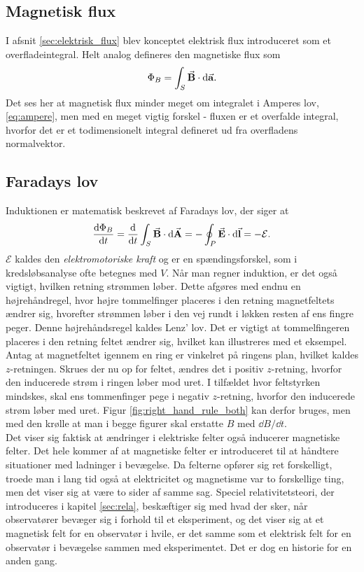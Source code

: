 \subsection{Magnetisk flux}
I afsnit \ref{sec:elektrisk_flux} blev konceptet elektrisk flux introduceret som et overfladeintegral. Helt analog defineres den magnetiske flux som
%
\begin{align} \label{eq:magnetisk_flux}
    \Phi_B = \int_S \va B \cdot \dd \va a.
\end{align}
%
Det ses her at magnetisk flux minder meget om integralet i Amperes lov, \eqref{eq:ampere}, men med en meget vigtig forskel - fluxen er et overfalde integral, hvorfor det er et todimensionelt integral defineret ud fra overfladens normalvektor.

\subsection{Faradays lov}
Induktionen er matematisk beskrevet af Faradays lov, der siger at
%
\begin{align} \label{eq:faraday}
    \dv{\Phi_B}{t} = \dv{}{t} \int_S \va B \cdot \dd \va A = - \oint_P \va E\cdot \dd \va l = -\mathcal{E}.
\end{align}
%
$\mathcal{E}$ kaldes den \emph{elektromotoriske kraft} og er en spændingsforskel, som i kredsløbsanalyse ofte betegnes med $V$. %
%
%
Når man regner induktion, er det også vigtigt, hvilken retning strømmen løber. Dette afgøres med endnu en højrehåndregel, hvor højre tommelfinger placeres i den retning magnetfeltets ændrer sig, hvorefter strømmen løber i den vej rundt i løkken resten af ens fingre peger. Denne højrehåndsregel kaldes Lenz' lov. Det er vigtigt at tommelfingeren placeres i den retning feltet ændrer sig, hvilket kan illustreres med et eksempel. Antag at magnetfeltet igennem en ring er vinkelret på ringens plan, hvilket kaldes $z$-retningen. Skrues der nu op for feltet, ændres det i positiv $z$-retning, hvorfor den inducerede strøm i ringen løber mod uret. I tilfældet hvor feltstyrken mindskes, skal ens tommenfinger pege i negativ $z$-retning, hvorfor den inducerede strøm løber med uret. Figur \ref{fig:right_hand_rule_both} kan derfor bruges, men med den krølle at man i begge figurer skal erstatte $B$ med $\dd{B}/\dd{t}$. \\
%
Det viser sig faktisk at ændringer i elektriske felter også inducerer magnetiske felter. Det hele kommer af at magnetiske felter er introduceret til at håndtere situationer med ladninger i bevægelse. Da felterne opfører sig ret forskelligt, troede man i lang tid også at elektricitet og magnetisme var to forskellige ting, men det viser sig at være to sider af samme sag. Speciel relativitetsteori, der introduceres i kapitel \ref{sec:rela}, beskæftiger sig med hvad der sker, når observatører bevæger sig i forhold til et eksperiment, og det viser sig at et magnetisk felt for en observatør i hvile, er det samme som et elektrisk felt for en observatør i bevægelse sammen med eksperimentet. Det er dog en historie for en anden gang.

